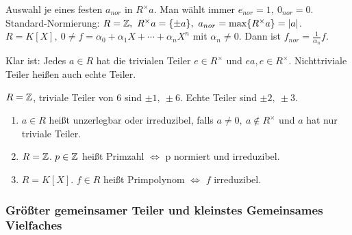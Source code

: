 \documentclass[a4paper,DIV15,BCOR12mm]{article}
\begin{document}
\begin{definition}[Normierung]Auswahl je eines festen $a_{nor}$ in
$R^{\times}a$. Man wählt immer $e_{nor}=1,\ 0_{nor}=0$.\\
Standard-Normierung: $R=\MdZ,\ R^{\times}a=\{\pm a\},\
a_{nor}=\max\{R^{\times}a\}=|a|$.\\
$R=K[X],\ 0\neq f=\alpha_0+\alpha_1 X + \dotsb + \alpha_n X^n$ mit
$\alpha_n \neq 0$. Dann ist $f_{nor}=\frac{1}{\alpha_n}f$.
\end{definition}
Klar ist: Jedes $a\in R$ hat die trivialen Teiler $e\in R^{\times}$
und $ea,  e \in R^{\times}$. Nichttriviale Teiler heißen auch echte
Teiler.
\begin{beispiel}
 $R=\mathbb{Z}$, triviale Teiler von $6$ sind $\pm 1,\ \pm 6$. Echte
 Teiler sind $\pm 2,\ \pm 3$.
\end{beispiel}
\begin{definition}
    \begin{enumerate}
        \item $a\in R$ heißt unzerlegbar oder irreduzibel, falls
            $a\neq 0,\ a \notin R^{\times}$ und $a$ hat nur triviale Teiler.
        \item $R=\mathbb{Z}$. $p\in\mathbb{Z}$ heißt Primzahl $\iff$ p normiert
            und irreduzibel.
        \item $R=K[X]$. $f \in R$ heißt Primpolynom $\iff$ $f$
            irreduzibel.
    \end{enumerate}
\end{definition}

\subsubsection*{Größter gemeinsamer Teiler und kleinstes Gemeinsames
Vielfaches}
\end{document}
